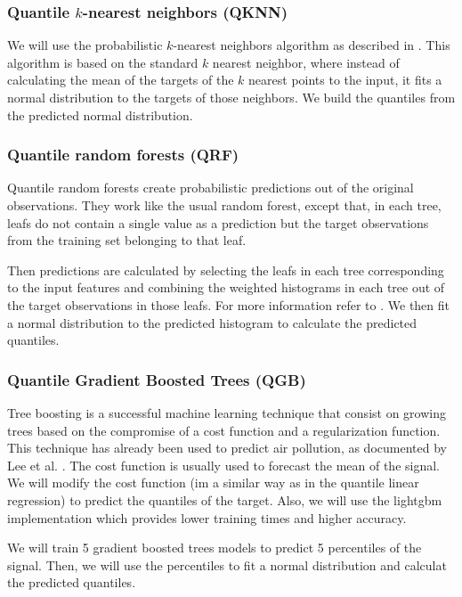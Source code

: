 \documentclass[a4paper,3p,sort&compress]{elsarticle}
\begin{document}
\subsubsection{Quantile $k$-nearest neighbors (QKNN)}

We will use the probabilistic $k$-nearest neighbors algorithm as
described in \cite{quantileknnmangalova}.  This algorithm is based on
the standard $k$ nearest neighbor, where instead of calculating the
mean of the targets of the $k$ nearest points to the input, it fits 
a normal distribution to the targets of those neighbors. 
We build the quantiles from the predicted normal distribution.

\subsubsection{Quantile random forests (QRF)}

Quantile random forests create probabilistic predictions out of the
original observations. They work like the usual random forest, except
that, in each tree, leafs do not contain a single value as a
prediction but the target observations from the training set belonging
to that
leaf.

Then predictions are calculated by selecting the leafs in each tree
corresponding to the input features and combining the weighted
histograms in each tree out of the target observations in those leafs.
For more information refer to \cite{quantregforests}.
We then fit a normal distribution to the predicted histogram to calculate 
the predicted quantiles.

\subsubsection{Quantile Gradient Boosted Trees (QGB)}

Tree boosting \cite{friedman_greedy_2001} is a successful
machine learning technique that consist on growing trees based on the
compromise of a cost function and a regularization function. 
This technique has already been used to predict air pollution,
as documented by Lee et al. \cite{lee_forecasting_2020}.
The cost
function is usually used to forecast the mean of the signal. We will
modify the cost function (im a similar way as in the quantile linear
regression) to predict the quantiles of the target. Also, we will use 
the lightgbm implementation \cite{ke_lightgbm:_2017} which provides 
lower training times and higher accuracy.

We will train 5 gradient boosted trees models to predict 5 percentiles
of the \no signal. Then, we will use the percentiles to fit a normal
distribution and calculat the predicted quantiles.
\end{document}
